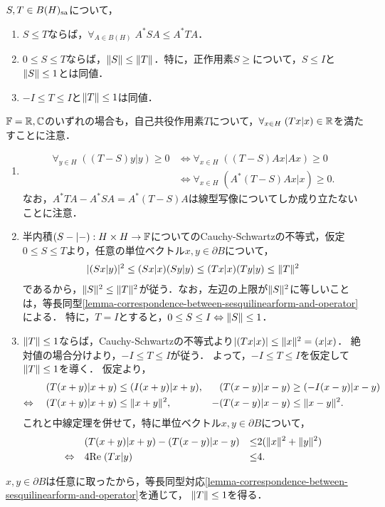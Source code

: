 \documentclass[uplatex,dvipdfmx]{jsreport}
\begin{document}
\begin{proposition}[自己共役作用素の順序]\label{prop-order-of-self-adjoint-operator}
    $S,T\in B(H)_{\mathrm{sa}}$について，
    \begin{enumerate}
        \item $S\le T$ならば，$\forall_{A\in B(H)}\;A^*SA\le A^*TA$．
        \item $0\le S\le T$ならば，$\|S\|\le\|T\|$．特に，正作用素$S\ge$について，$S\le I$と$\|S\|\le1$とは同値．
        \item $-I\le T\le I$と$\|T\|\le 1$は同値．
    \end{enumerate}
\end{proposition}
\begin{Proof}
    $\mathbb{F}=\mathbb{R},\mathbb{C}$のいずれの場合も，自己共役作用素$T$について，$\forall_{x\in H}\;(Tx|x)\in\mathbb{R}$を満たすことに注意．
    \begin{enumerate}
        \item \begin{align*}
            \forall_{y\in H}\;((T-S)y|y)\ge0&\Leftrightarrow\forall_{x\in H}\;((T-S)Ax|Ax)\ge0\\
            &\Leftrightarrow\forall_{x\in H}\;(A^*(T-S)Ax|x)\ge0.
        \end{align*}
        なお，$A^*TA-A^*SA=A^*(T-S)A$は線型写像についてしか成り立たないことに注意．
        \item 半内積$(S-|-):H\times H\to\mathbb{F}$についてのCauchy-Schwartzの不等式，仮定$0\le S\le T$より，任意の単位ベクトル$x,y\in\partial B$について，
        \begin{align*}
            \lvert(Sx|y)\rvert^2\le(Sx|x)(Sy|y)\le(Tx|x)(Ty|y)\le\|T\|^2
        \end{align*}
        であるから，$\|S\|^2\le\|T\|^2$が従う．なお，左辺の上限が$\|S\|^2$に等しいことは，等長同型\ref{lemma-correspondence-between-sesquilinearform-and-operator}による．
        特に，$T=I$とすると，$0\le S\le I\Leftrightarrow\|S\|\le 1$．
        \item $\|T\|\le 1$ならば，Cauchy-Schwartzの不等式より$\lvert(Tx|x)\rvert\le\|x\|^2=(x|x)$．
        絶対値の場合分けより，$-I\le T\le I$が従う．
        よって，$-I\le T\le I$を仮定して$\|T\|\le 1$を導く．
        仮定より，
        \begin{align*}
            (T(x+y)|x+y)&\le(I(x+y)|x+y),&(T(x-y)|x-y)&\ge(-I(x-y)|x-y)\\
            \Leftrightarrow\quad(T(x+y)|x+y)&\le\|x+y\|^2,&-(T(x-y)|x-y)&\le\|x-y\|^2.
        \end{align*}
        これと中線定理を併せて，特に単位ベクトル$x,y\in\partial B$について，
        \begin{align*}
            &(T(x+y)|x+y)-(T(x-y)|x-y)&\le &2(\|x\|^2+\|y\|^2)\\
            \Leftrightarrow\quad&4\mathrm{Re}\;(Tx|y)&\le&4.
        \end{align*}
    \end{enumerate}
    $x,y\in\partial B$は任意に取ったから，等長同型対応\ref{lemma-correspondence-between-sesquilinearform-and-operator}を通じて，
    $\|T\|\le 1$を得る．
\end{Proof}
\end{document}
